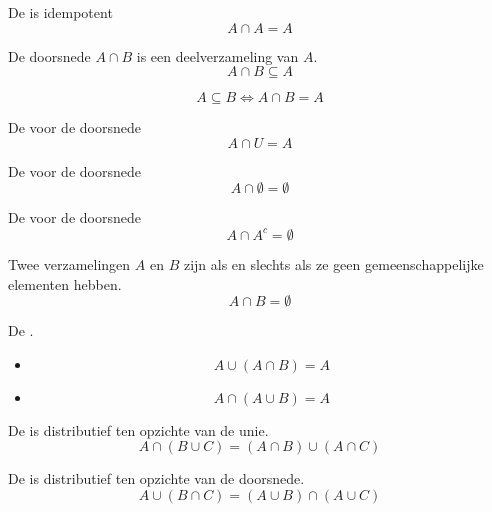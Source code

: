 \documentclass[main.tex]{subfiles}
\begin{document}
\begin{ei}
  De  is idempotent
  \[ A \cap A = A \]
\end{ei} 

\begin{st}
  De doorsnede $A \cap B$ is een deelverzameling van $A$.
  \[ A \cap B \subseteq A \]
\end{st}

\begin{st}
  \[ A \subseteq B \Leftrightarrow A \cap B = A \]
\end{st}


\begin{st}
  De  voor de doorsnede
  \[ A \cap U = A \]
\end{st}

\begin{st}
  De  voor de doorsnede
  \[ A \cap \emptyset = \emptyset \]
\end{st}

\begin{st}
  De  voor de doorsnede
  \[ A \cap A^{c} = \emptyset \]
\end{st}

\begin{de}
  Twee verzamelingen $A$ en $B$ zijn  als en slechts als ze geen gemeenschappelijke elementen hebben.
  \[ A \cap B = \emptyset \]
\end{de}

\begin{st}
  De .
  \begin{itemize}
  \item \[ A \cup ( A \cap B ) = A\]
  \item \[ A \cap ( A \cup B ) = A\]
  \end{itemize}
\end{st}

\begin{st}
  De  is distributief ten opzichte van de unie.
  \[ A \cap ( B \cup C ) = (A \cap B) \cup (A \cap C) \]

\end{st}

\begin{st}
  De  is distributief ten opzichte van de doorsnede.
  \[ A \cup ( B \cap C ) = (A \cup B) \cap (A \cup C) \]

\end{st}
\end{document}
